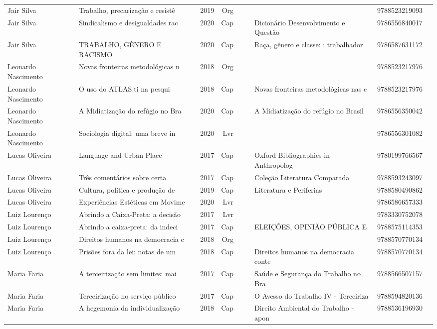 \documentclass[12pt,brazil]{article}\usepackage[]{graphicx}\usepackage[]{xcolor}
\begin{document}
\begin{longtable}{lllrrllrr}
Jair Silva & Trabalho, precarização e resistê & 2019 & Org &  &  &  & 9788523219093 \\
Jair Silva & Sindicalismo e desigualdades rac & 2020 & Cap &  &  & Dicionário Desenvolvimento e Questão & 9786556840017 \\
Jair Silva & TRABALHO, GÊNERO E RACISMO  & 2020 & Cap &  &  & Raça, gênero e classe: : trabalhador & 9786587631172 \\
Leonardo Nascimento & Novas fronteiras metodológicas n & 2018 & Org &  &  &  & 9788523217976 \\
Leonardo Nascimento & O uso do ATLAS.ti na pesqui & 2018 & Cap &  &  & Novas fronteiras metodológicas nas c & 9788523217976 \\
Leonardo Nascimento & A Midiatização do refúgio no Bra & 2020 & Cap &  &  & A Midiatização do refúgio no Brasil  & 9786556350042 \\
Leonardo Nascimento & Sociologia digital: uma breve in & 2020 & Lvr &  &  &  & 9786556301082 \\
Lucas Oliveira & Language and Urban Place & 2017 & Cap &  &  & Oxford Bibliographies in Anthropolog & 9780199766567 \\
Lucas Oliveira & Três comentários sobre certa & 2017 & Cap &  &  & Coleção Literatura Comparada & 9788593243097 \\
Lucas Oliveira & Cultura, política e produção de  & 2019 & Cap &  &  & Literatura e Periferias & 9788580490862 \\
Lucas Oliveira & Experiências Estéticas em Movime & 2020 & Lvr &  &  &  & 9786586657333 \\
Luiz Lourenço & Abrindo a Caixa-Preta: a decisão & 2017 & Lvr &  &  &  & 9783330752078 \\
Luiz Lourenço & Abrindo a caixa-preta: da indeci & 2017 & Cap &  &  & ELEIÇÕES, OPINIÃO PÚBLICA E & 9788575114353 \\
Luiz Lourenço & Direitos humanos na democracia c & 2018 & Org &  &  &  & 9788570770134 \\
Luiz Lourenço & Prisões fora da lei: notas de um & 2018 & Cap &  &  & Direitos humanos na democracia conte & 9788570770134 \\
Maria Faria & A terceirização sem limites: mai & 2017 & Cap &  &  & Saúde e Segurança do Trabalho no Bra & 9788566507157 \\
Maria Faria & Terceirização no serviço público & 2017 & Cap &  &  & O Avesso do Trabalho IV - Terceiriza & 9788594820136 \\
Maria Faria & A hegemonia da individualização  & 2018 & Cap &  &  & Direito Ambiental do Trabalho - apon & 9788536196930 \\

\end{longtable}
\end{document}
